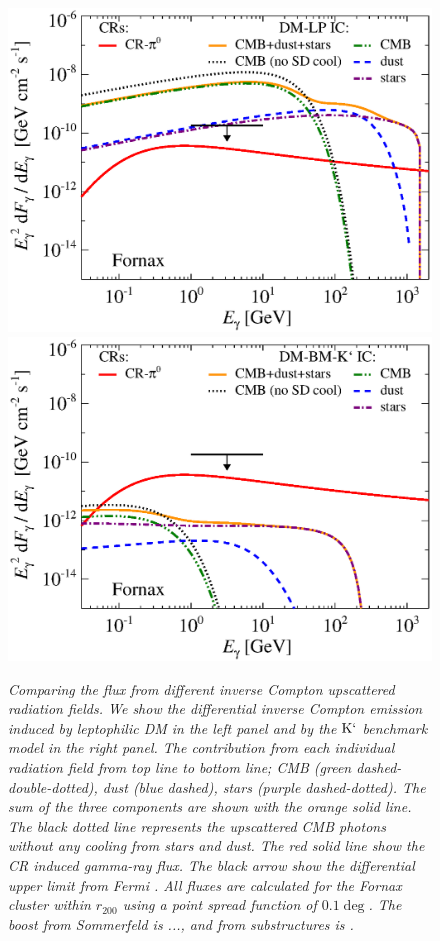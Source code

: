 \documentclass[10pt,aps,pra,reprint,amsmath,amsfonts,amssymb,showpacs]{revtex4-1}
\newcommand{\rmn}{\mathrm}
\newcommand{\Kp}{\rmn{K}`}
\newcommand{\rvir}{r_{200}}
\begin{document}
\begin{figure}
\begin{minipage}{2.0\columnwidth}
\includegraphics[width=0.49\columnwidth]{figures/flux.IRcomp.v9.0.1deg.1.6T.SubMass.elmu.SF300.noMW.woGal.eps}
\includegraphics[width=0.49\columnwidth]{figures/flux.IRcomp.BMv9.0.1deg.SubMass.noMW.woGal.eps}
\caption{\it Comparing the flux from different inverse Compton
  upscattered radiation fields. We show the differential inverse
  Compton emission induced by leptophilic DM in the left panel and by
  the $\Kp$ benchmark model in the right panel. The contribution from
  each individual radiation field from top line to bottom line; CMB
  (green dashed-double-dotted), dust (blue dashed), stars (purple
  dashed-dotted). The sum of the three components are shown with the
  orange solid line. The black dotted line represents the upscattered
  CMB photons without any cooling from stars and dust. The red solid
  line show the CR induced gamma-ray flux. The black arrow show the
  differential upper limit from Fermi \cite{2010ApJ...717L..71A}. All
  fluxes are calculated for the Fornax cluster within $\rvir$ using a
  point spread function of $0.1\deg$. The boost from Sommerfeld is
  ..., and from substructures is .}
 \label{fig:IR_comp}
\end{minipage}
\end{figure}
\end{document}

